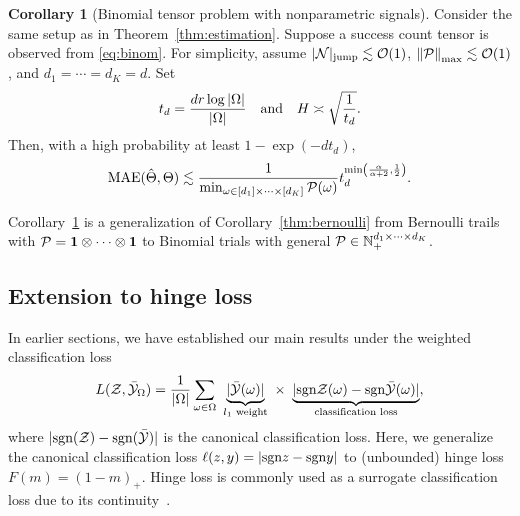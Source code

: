 \documentclass[twoside,11pt]{article}
\theoremstyle{definition}
\newtheorem{cor}{Corollary}
\newcommand*{\KeepStyleUnderBrace}[1]{%
  \mathop{%
    \mathchoice
    {\underbrace{\displaystyle#1}}%
    {\underbrace{\textstyle#1}}%
    {\underbrace{\scriptstyle#1}}%
    {\underbrace{\scriptscriptstyle#1}}%
  }\limits
}
\def\sign{\textup{sgn}}
\begin{document}
\begin{cor}[Binomial tensor problem with nonparametric signals]\label{thm:binom}
Consider the same setup as in Theorem~\ref{thm:estimation}. Suppose a success count tensor is observed from \eqref{eq:binom}. For simplicity, assume $|\mathcal{N}|_{\text{jump}}\lesssim \mathcal{O}(1)$, $\left\lVert\mathcal{P}\right\rVert_{\max}\lesssim \mathcal{O}(1)$, and $d_1=\cdots=d_K=d$. Set
\[
t_d ={d r \log |\Omega|\over |\Omega|} \quad \text{and}\quad H\asymp \sqrt{1\over t_d}.
\] 
Then, with a high probability at least $1-\exp(-d t_d)$,
\begin{equation}\label{eq:bound5}
\textup{MAE}(\hat \Theta, \Theta)\lesssim \frac{1}{\min_{\omega\in[d_1]\times\cdots\times[d_K]}\mathcal{P}(\omega)}{t_d^{\min\left({\alpha\over \alpha+2}, {1\over 2}\right)}}.
\end{equation}
\end{cor}
Corollary~\ref{thm:binom} is a generalization of Corollary~\ref{thm:bernoulli} from Bernoulli trails with $\mathcal{P}=\mathbf{1}\otimes \cdots \otimes \mathbf{1}$ to Binomial trials with general $\mathcal{P}\in\mathbb{N}_{+}^{d_1\times \cdots \times d_K}$. 

\subsection{Extension to hinge loss}\label{sec:implementation}
In earlier sections, we have established our main results under the weighted classification loss 
\begin{equation}
L(\tZ, \bar \tY_\Omega)= {1\over |\Omega|}\sum_{\omega \in \Omega}\ \KeepStyleUnderBrace{|\bar \tY(\omega)|}_{\text{$l_1$ weight}}\  \times \ \KeepStyleUnderBrace{| \sign \tZ(\omega)-\sign \bar \tY(\omega)|}_{\text{classification loss}},
\end{equation}
where $|\sign(\tZ)-\sign(\bar \tY)|$ is the canonical classification loss. Here, we generalize the canonical classification loss $\ell(z,y)=|\sign z - \sign y|$ to (unbounded) hinge loss $F(m) = (1-m)_+$. 
Hinge loss is commonly used as a surrogate classification loss due to its continuity~\citep{bartlett2006convexity,genzel2020robust,he2017kernelized}. 
\end{document}
